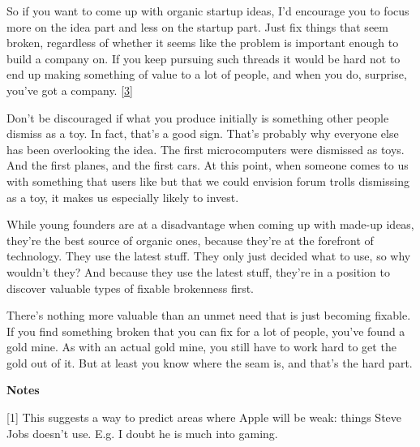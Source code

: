 So if you want to come
                    up with organic startup ideas, I'd encourage you to focus
                    more on the idea part and less on the startup part. Just fix
                    things that seem broken, regardless of whether it seems like
                    the problem is important enough to build a company on. If
                    you keep pursuing such threads it would be hard not to end
                    up making something of value to a lot of people, and when
                    you do, surprise, you've got a company.
                    [\href{\#f3n}{3}]

Don't be discouraged if what you produce
                    initially is something other people dismiss as a toy. In
                    fact, that's a good sign. That's probably why everyone else
                    has been overlooking the idea. The first microcomputers were
                    dismissed as toys. And the first planes, and the first cars.
                    At this point, when someone comes to us with something that
                    users like but that we could envision forum trolls
                    dismissing as a toy, it makes us especially likely to
                    invest.

While young founders are at a
                    disadvantage when coming up with made-up ideas, they're the
                    best source of organic ones, because they're at the
                    forefront of technology. They use the latest stuff. They
                    only just decided what to use, so why wouldn't they? And
                    because they use the latest stuff, they're in a position to
                    discover valuable types of fixable brokenness first.

There's
                    nothing more valuable than an unmet need that is just
                    becoming fixable. If you find something broken that you can
                    fix for a lot of people, you've found a gold mine. As with
                    an actual gold mine, you still have to work hard to get the
                    gold out of it. But at least you know where the seam is, and
                    that's the hard part.





\textbf{Notes}

[1] This suggests a way to predict areas where Apple will be
                    weak: things Steve Jobs doesn't use. E.g. I doubt he is much
                    into gaming.


